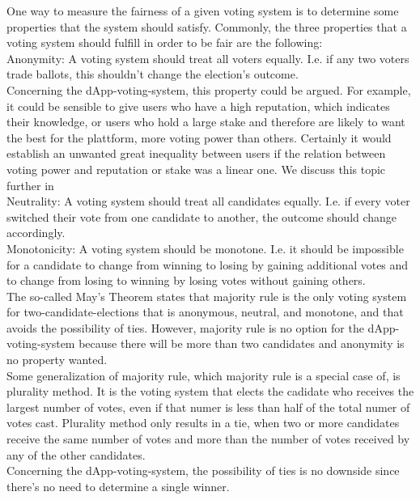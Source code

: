 
One way to measure the fairness of a given voting system is to determine some properties that the system should satisfy. 
Commonly, the three properties that a voting system should fulfill in order to be fair are the following: \\
Anonymity: A voting system should treat all voters equally. I.e. if any two voters trade ballots, this shouldn't change the election's outcome. \\
Concerning the dApp-voting-system, this property could be argued. For example, it could be sensible to give users who have a high reputation, which indicates their knowledge, or users who hold a large stake and therefore are likely to want the best for the plattform, more voting power than others. Certainly it would establish an unwanted great inequality between users if the relation between voting power and reputation or stake was a linear one. We discuss this topic further in \\%
Neutrality: A voting system should treat all candidates equally. I.e. if every voter switched their vote from one candidate to another, the outcome should change accordingly. \\
Monotonicity: A voting system should be monotone. I.e. it should be impossible for a candidate to change from winning to losing by gaining additional votes and to change from losing to winning by losing votes without gaining others. \\
The so-called May's Theorem states that majority rule %
is the only voting system for two-candidate-elections that is anonymous, neutral, and monotone, and that avoids the possibility of ties. However, majority rule is no option for the dApp-voting-system because there will be more than two candidates and anonymity is no property wanted. \\
Some generalization of majority rule, which majority rule is a special case of, is plurality method. It is the voting system that elects the cadidate who receives the largest number of votes, even if that numer is less than half of the total numer of votes cast. Plurality method only results in a tie, when two or more candidates receive the same number of votes and more than the number of votes received by any of the other candidates. \\
Concerning the dApp-voting-system, the possibility of ties is no downside since there's no need to determine a single winner. %





